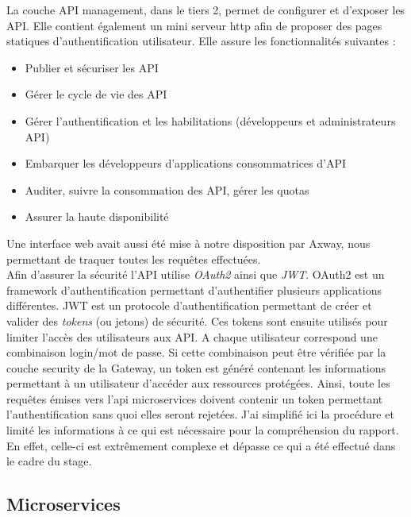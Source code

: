 	La couche API management, dans le tiers 2, permet de configurer et d’exposer les API. Elle contient également un mini serveur http afin de proposer des pages statiques d’authentification utilisateur. Elle assure les fonctionnalités suivantes : \\
	
	\begin{itemize}
		\item Publier et sécuriser les API
		\item Gérer le cycle de vie des API
		\item Gérer l’authentification et les habilitations (développeurs et administrateurs API)
		\item Embarquer les développeurs d’applications consommatrices d’API
		\item Auditer, suivre la consommation des API, gérer les quotas
		\item Assurer la haute disponibilité \\
	\end{itemize}
	
	Une interface web avait aussi été mise à notre disposition par Axway, nous permettant de traquer toutes les requêtes effectuées. \\
	
	Afin d'assurer la sécurité l'API utilise \textit{OAuth2} ainsi que \textit{JWT}. OAuth2 est un framework d'authentification permettant d'authentifier plusieurs applications différentes. JWT est un protocole d'authentification permettant de créer et valider des \textit{tokens} (ou jetons) de sécurité. Ces tokens sont ensuite utilisés pour limiter l'accès des utilisateurs aux API. A chaque utilisateur correspond une combinaison login/mot de passe. Si cette combinaison peut être vérifiée par la couche security de la Gateway, un token est généré contenant les informations permettant à un utilisateur d'accéder aux ressources protégées. Ainsi, toute les requêtes émises vers l'api microservices doivent contenir un token permettant l'authentification sans quoi elles seront rejetées. J'ai simplifié ici la procédure et limité les informations à ce qui est nécessaire pour la compréhension du rapport. En effet, celle-ci est extrêmement complexe et dépasse ce qui a été effectué dans le cadre du stage.
	
\subsection{Microservices}

